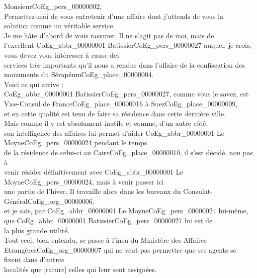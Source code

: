 \documentclass{book}
\begin{document}
\hspace{1cm}Monsieur\gls{CoEg_pers_00000002},\\

\indent Permettez-moi de vous entretenir d’une affaire dont j’attends de vous la\\
solution comme un véritable service.\\
\indent Je me hâte d’abord de vous rassurer. Il ne s’agit pas de moi, mais de\\
l’excellent \gls{CoEg_abbr_00000001} Batissier\gls{CoEg_pers_00000027} auquel, je crois, vous devez vous intéresser à cause des\\
services très-importants qu’il nous a rendus dans l’affaire de la confiscation des\\
monuments du Sérapéum\gls{CoEg_place_00000004}.\\
\indent Voici ce qui arrive :\\
\indent \gls{CoEg_abbr_00000001} Batissier\gls{CoEg_pers_00000027}, comme vous le savez, est Vice-Consul de France\gls{CoEg_place_00000016} à Suez\gls{CoEg_place_00000009},\\
et en cette qualité est tenu de faire sa résidence dans cette dernière ville.\\
\indent Mais comme il y est absolument inutile et comme, d’un autre côté,\\
son intelligence des affaires lui permet d’aider \gls{CoEg_abbr_00000001} Le Moyne\gls{CoEg_pers_00000024} pendant le temps\\
de la résidence de celui-ci au Caire\gls{CoEg_place_00000010}, il s’est décidé, non pas à\\
venir résider définitivement avec \gls{CoEg_abbr_00000001} Le Moyne\gls{CoEg_pers_00000024}, mais à venir passer ici\\
une partie de l’hiver. Il travaille alors dans les bureaux du Consulat-Général\gls{CoEg_org_00000006},\\
et je sais, par \gls{CoEg_abbr_00000001} Le Moyne\gls{CoEg_pers_00000024} lui-même, que \gls{CoEg_abbr_00000001} Batissier\gls{CoEg_pers_00000027} lui est de\\
la plus grande utilité.\\
\indent Tout ceci, bien entendu, se passe à l’insu du Ministère des Affaires\\
Etrangères\gls{CoEg_org_00000007} qui ne veut pas permettre que ses agents se fixent dans d’autres\\
localités que [rature] celles qui leur sont assignées.\\
\end{document}
